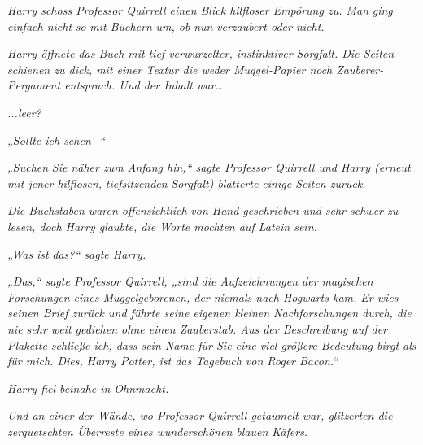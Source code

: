 {\emph{Harry schoss Professor Quirrell einen Blick hilfloser Empörung zu. Man} \emph{\emph{ging}} \emph{einfach nicht} \emph{so} \emph{mit Büchern} \emph{um, ob} \emph{nun} \emph{verzaubert oder nicht.}

\emph{Harry öffnete das Buch mit} \emph{tief verwurzelter, instinktiver Sorgfalt. Die Seiten schienen zu dick, mit einer Textur die weder Muggel-Papier noch Zauberer-Pergament entsprach. Und der Inhalt war…}

\emph{...leer?}

\emph{„Sollte ich sehen -“}

\emph{„Suchen} \emph{Sie näher zum Anfang hin,“ sagte Professor Quirrell und Harry (erneut mit jener hilflosen,} \emph{tiefsitzenden} \emph{Sorgfalt) blätterte einige Seiten zurück.}

\emph{Die Buchstaben waren offensichtlich} \emph{von Hand geschrieben und sehr schwer zu lesen, doch Harry glaubte, die Worte mochten auf Latein sein.}

\emph{„Was} \emph{\emph{ist}} \emph{das?“ sagte Harry.}

\emph{„Das,“ sagte Professor Quirrell, „sind die Aufzeichnungen der magischen Forschungen eines Muggelgeborenen, der niemals nach Hogwarts kam. Er wies seinen Brief zurück und führte seine eigenen kleinen Nachforschungen durch, die nie sehr weit gediehen ohne einen Zauberstab. Aus der Beschreibung auf der Plakette schließe ich, dass sein Name für Sie eine viel größere Bedeutung birgt als für mich. Dies, Harry Potter, ist das Tagebuch von Roger Bacon.“}

\emph{Harry fiel beinahe in Ohnmacht.}

\emph{Und an einer der Wände, wo Professor Quirrell getaumelt war, glitzerten die zerquetschten Überreste eines wunderschönen blauen Käfers.}

}

